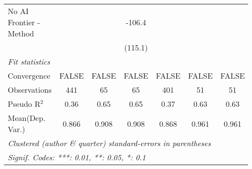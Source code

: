 \begin{tabular}{lcccccc}
   No AI Frontier - Method &            &             & -106.4        &            &              &   \\   
                           &            &             & (115.1)       &            &              &   \\   
   \midrule
   \emph{Fit statistics}\\
   Convergence             &FALSE       & FALSE       & FALSE         & FALSE      & FALSE        & FALSE\\  
   Observations            & 441        & 65          & 65            & 401        & 51           & 51\\  
   Pseudo R$^2$            & 0.36       & 0.65        & 0.65          & 0.37       & 0.63         & 0.63\\  
Mean(Dep. Var.) & 0.866 & 0.908 & 0.908 & 0.868 & 0.961 & 0.961 \\
   \midrule \midrule
   \multicolumn{7}{l}{\emph{Clustered (author \& quarter) standard-errors in parentheses}}\\
   \multicolumn{7}{l}{\emph{Signif. Codes: ***: 0.01, **: 0.05, *: 0.1}}\\
\end{tabular}
\par\endgroup
